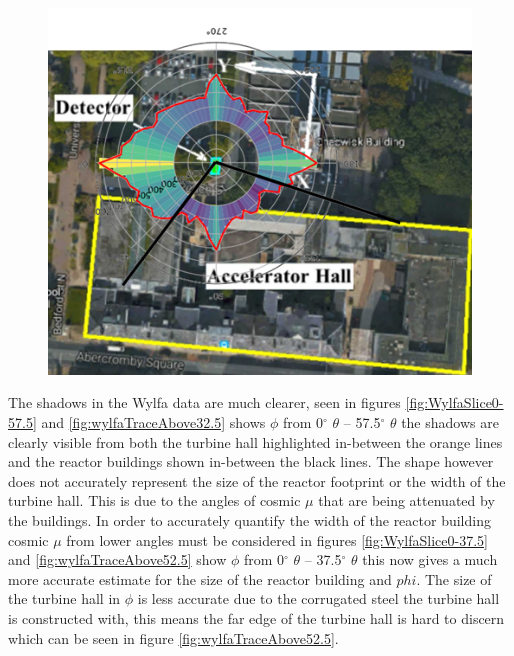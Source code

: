 \begin{figure}[H]
 \centering
 \includegraphics[width=0.8\linewidth]{Chapter5/Figs/Raster/liverpoolShadows.png}
 \label{fig:liverpoolCirShadows}
\end{figure}

The shadows in the Wylfa data are much clearer, seen in figures \ref{fig:WylfaSlice0-57.5} and \ref{fig:wylfaTraceAbove32.5} shows $\phi$ from 0$^{\circ}$ $\theta$ -- 57.5$^{\circ}$ $\theta$ the shadows are clearly visible from both the turbine hall highlighted in-between the orange lines and the reactor buildings shown in-between the black lines. The shape however does not accurately represent the size of the reactor footprint or the width of the turbine hall. This is due to the angles of cosmic $\mu$ that are being attenuated by the buildings. In order to accurately quantify the width of the reactor building cosmic $\mu$ from lower angles must be considered in figures \ref{fig:WylfaSlice0-37.5} and \ref{fig:wylfaTraceAbove52.5}  show $\phi$ from 0$^{\circ}$ $\theta$ -- 37.5$^{\circ}$ $\theta$ this now gives a much more accurate estimate for the size of the reactor building and $phi$. The size of the turbine hall in $\phi$ is less accurate due to the corrugated steel the turbine hall is constructed with, this means the far edge of the turbine hall is hard to discern which can be seen in figure \ref{fig:wylfaTraceAbove52.5}.

